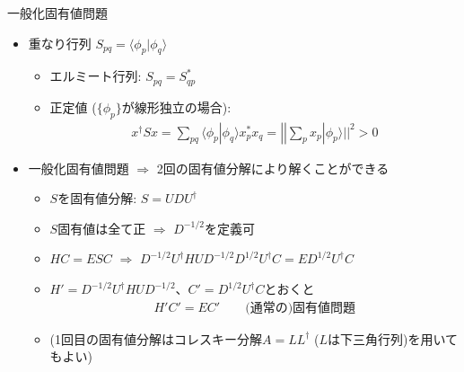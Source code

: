 
\begin{frame}[t,fragile]{一般化固有値問題}
  \begin{itemize}
  \item 重なり行列 $S_{pq} = \langle \phi_p | \phi_q \rangle$
    \begin{itemize}
      \item エルミート行列: $S_{pq} = S_{qp}^*$
      \item 正定値 ($\{\phi_p\}$が線形独立の場合):
        \begin{align*}
          x^\dagger S x = \sum_{pq} \langle \phi_p | \phi_q \rangle x_p^* x_q = || \sum_p x_p | \phi_p \rangle ||^2 > 0
        \end{align*}
    \end{itemize}
  \item 一般化固有値問題 $\Rightarrow$ 2回の固有値分解により解くことができる
    \begin{itemize}
      \item $S$を固有値分解: $S = U D U^\dagger$
      \item $S$固有値は全て正 $\Rightarrow$ $D^{-1/2}$を定義可
      \item $HC=ESC$ $\Rightarrow$ $D^{-1/2} U^\dagger H U D^{-1/2} D^{1/2} U^\dagger C = E D^{1/2} U^\dagger C$
      \item $H' = D^{-1/2} U^\dagger H U D^{-1/2}$、$C'=D^{1/2} U^\dagger C$とおくと
        \begin{align*}
          H'C' = EC' \qquad \text{(通常の)固有値問題}
        \end{align*}
      \item (1回目の固有値分解はコレスキー分解$A=L L^\dagger$ ($L$は下三角行列)を用いてもよい)
    \end{itemize}
  \end{itemize}
\end{frame}
